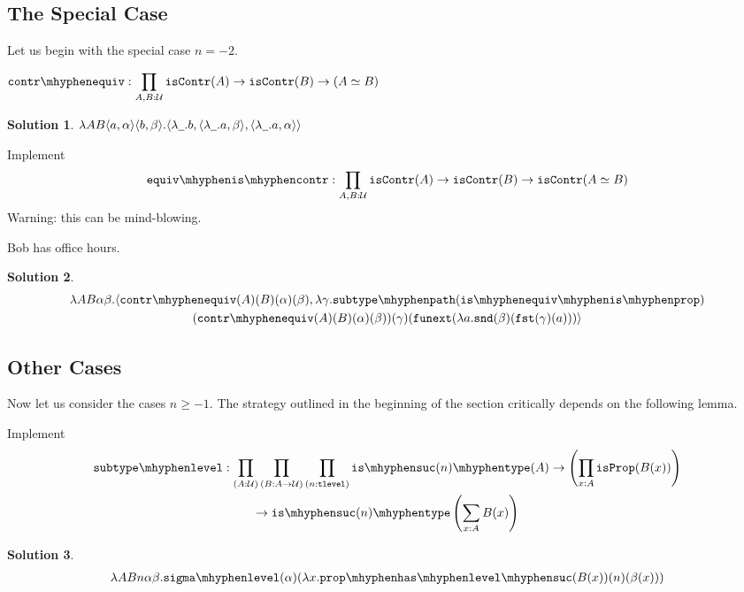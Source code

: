 \documentclass[12pt]{article}
\newcommand{\cut}[1]{}
\newcommand{\marksolution}[1]{\color{FireBrick}#1\normalcolor}%
\newcommand{\marksolution}[1]{\cut{#1}}%
\theoremstyle{plain}
\newtheorem*{solution}{Solution}
\begin{document}
\subsection{The Special Case}

Let us begin with the special case $n = -2$.
\begin{task}
  $\displaystyle
  \contrequiv :
  \prod_{A,B:\U}
  \iscontr(A) \to
  \iscontr(B) \to
  (A \eqv B)
  $
\end{task}
\marksolution{
  \begin{solution}
    $
    \lambda AB\langle a,\alpha\rangle \langle b,\beta\rangle.\langle \lambda\underline{\hspace{0.5em}}.b,
      \langle \lambda\underline{\hspace{0.5em}}.a,\beta\rangle
    ,
      \langle \lambda\underline{\hspace{0.5em}}.a,\alpha\rangle
    \rangle
    $
  \end{solution}
}
\begin{task} Implement
  \[
    \equiviscontr :
    \prod_{A,B:\U}
    \iscontr(A) \to \iscontr(B) \to \iscontr(A \eqv B)
  \]
  Warning: this can be mind-blowing.
  \begin{hint}
    Bob has office hours.
  \end{hint}
\end{task}
\marksolution{
  \begin{solution}
    \begin{multline*}
      \lambda AB\alpha\beta.\pair{
        \contrequiv(A)(B)(\alpha)(\beta)
      }{
        \lambda \gamma.\subtypepath(\isequivisprop)
        \\
        (\contrequiv(A)(B)(\alpha)(\beta))
      (\gamma)(\funext(\lambda a.\snd(\beta)(\fst(\gamma)(a)))}
    \end{multline*}
  \end{solution}
}

\subsection{Other Cases}

Now let us consider the cases $n \geq -1$.
The strategy outlined in the beginning of the section critically depends on the following lemma.
\begin{task} Implement
  \begin{multline*}
    \subtypelevel :
    \prod_{(A:\U)}
    \prod_{(B:A\to\U)}
    \prod_{(n:\tlevel)}
    \istype{\suc(n)}(A)
    \to
    \left(\prod_{x:A} \isprop(B(x))\right)
    \\
    \to
    \istype{\suc(n)}\left(\sum_{x:A}B(x)\right)
  \end{multline*}
\end{task}
\marksolution{
  \begin{solution}
    \begin{multline*}
      \lambda A B n \alpha \beta.\sigmalevel(\alpha)(\lambda x.\prophaslevelsuc(B(x))(n)(\beta(x)))
    \end{multline*}
  \end{solution}
}
\end{document}
